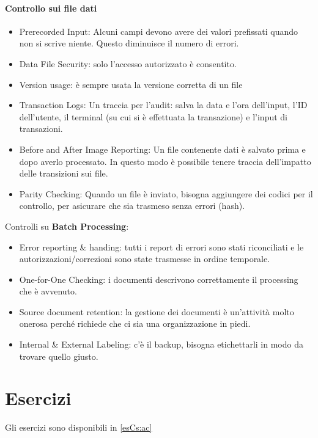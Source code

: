 \paragraph{Controllo sui file dati}
\begin{itemize}
\item
Prerecorded Input: Alcuni campi devono avere dei valori prefissati
quando non si scrive niente. Questo diminuisce il numero di errori.

\item
Data File Security: solo l'accesso autorizzato è consentito.
\item
Version usage: è sempre usata la versione corretta di un file
\item
Transaction Logs: Un traccia per l'audit: salva la data e l'ora dell'input,
l'ID dell'utente, il terminal (su cui si è effettuata la transazione) e
l'input di transazioni.
\item
Before and After Image Reporting: Un file contenente dati è salvato
prima e dopo averlo processato. In questo modo è possibile tenere traccia
dell'impatto delle transizioni sui file.
\item 
Parity Checking: Quando un file è inviato, bisogna aggiungere dei codici
per il controllo, per asicurare che sia trasmeso senza errori (hash).
\end{itemize}

Controlli su \textbf{Batch Processing}:
\begin{itemize}
\item
Error reporting \& handing: tutti i report di errori sono stati riconciliati
e le autorizzazioni/correzioni sono state trasmesse in ordine temporale.
\item
One-for-One Checking: i documenti descrivono correttamente il processing
che è avvenuto.
\item
Source document retention: la gestione dei documenti è un'attività molto
onerosa perché richiede che ci sia una organizzazione in piedi.
\item
Internal \& External Labeling: c'è il backup, bisogna etichettarli in 
modo da trovare quello giusto.
\end{itemize}





\section{Esercizi}

Gli esercizi sono disponibili in \ref{esCs:ac}

